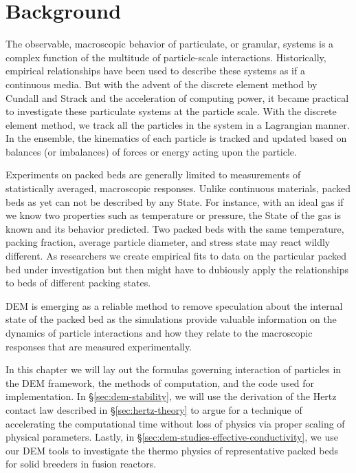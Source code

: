 \section{Background}
\label{sec:dem-intro}

The observable, macroscopic behavior of particulate, or granular, systems is a complex function of the multitude of particle-scale interactions. Historically, empirical relationships have been used to describe these systems as if a continuous media. But with the advent of the discrete element method by Cundall and Strack\cite{Cundall1979} and the acceleration of computing power, it became practical to investigate these particulate systems at the particle scale. With the discrete element method, we track all the particles in the system in a Lagrangian manner. In the ensemble, the kinematics of each particle is tracked and updated based on balances (or imbalances) of forces or energy acting upon the particle.

Experiments on packed beds are generally limited to measurements of statistically averaged, macroscopic responses. Unlike continuous materials, packed beds as yet can not be described by any State. For instance, with an ideal gas if we know two properties such as temperature or pressure, the State of the gas is known and its behavior predicted. Two packed beds with the same temperature, packing fraction, average particle diameter, and stress state may react wildly different. As researchers we create empirical fits to data on the particular packed bed under investigation but then might have to dubiously apply the relationships to beds of different packing states. 

DEM is emerging as a reliable method to remove speculation about the internal state of the packed bed as the simulations provide valuable information on the dynamics of particle interactions and how they relate to the macroscopic responses that are measured experimentally.

In this chapter we will lay out the formulas governing interaction of particles in the DEM framework, the methods of computation, and the code used for implementation. In \S\ref{sec:dem-stability}, we will use the derivation of the Hertz contact law described in \S\ref{sec:hertz-theory} to argue for a technique of accelerating the computational time without loss of physics via proper scaling of physical parameters. Lastly, in \S\ref{sec:dem-studies-effective-conductivity}, we use our DEM tools to investigate the thermo physics of representative packed beds for solid breeders in fusion reactors.
